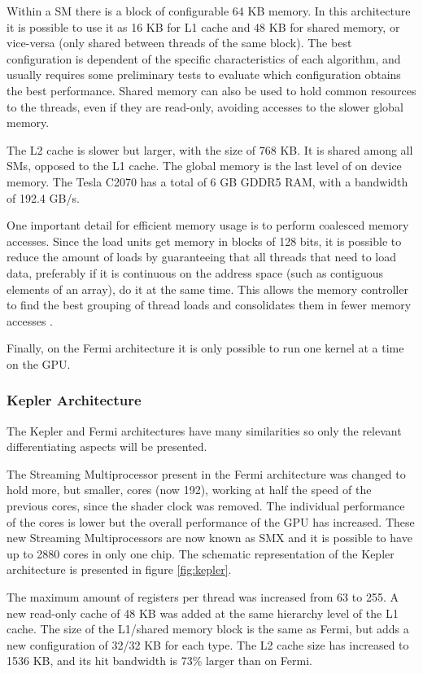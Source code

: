 Within a SM there is a block of configurable 64 KB memory. In this architecture it is possible to use it as 16 KB for L1 cache and 48 KB for shared memory, or vice-versa (only shared between threads of the same block). The best configuration is dependent of the specific characteristics of each algorithm, and usually requires some preliminary tests to evaluate which configuration obtains the best performance. Shared memory can also be used to hold common resources to the threads, even if they are read-only, avoiding accesses to the slower global memory.

The L2 cache is slower but larger, with the size of 768 KB. It is shared among all SMs, opposed to the L1 cache. The global memory is the last level of on device memory. The Tesla C2070 has a total of 6 GB GDDR5 RAM, with a bandwidth of 192.4 GB/s.

One important detail for efficient memory usage is to perform coalesced memory accesses. Since the load units get memory in blocks of 128 bits, it is possible to reduce the amount of loads by guaranteeing that all threads that need to load data, preferably if it is continuous on the address space (such as contiguous elements of an array), do it at the same time. This allows the memory controller to find the best grouping of thread loads and consolidates them in fewer memory accesses \cite{NVIDIA:Fermi}.

Finally, on the Fermi architecture it is only possible to run one kernel at a time on the GPU.

\subsubsection{\nvidia Kepler Architecture}

The Kepler and Fermi architectures have many similarities so only the relevant differentiating aspects will be presented.

The Streaming Multiprocessor present in the Fermi architecture was changed to hold more, but smaller, \cuda cores (now 192), working at half the speed of the previous \cuda cores, since the shader clock was removed. The individual performance of the \cuda cores is lower but the overall performance of the GPU has increased. These new Streaming Multiprocessors are now known as SMX and it is possible to have up to 2880 \cuda cores in only one chip. The schematic representation of the Kepler architecture is presented in figure \ref{fig:kepler}.

The maximum amount of registers per \cuda thread was increased from 63 to 255. A new read-only cache of 48 KB was added at the same hierarchy level of the L1 cache. The size of the L1/shared memory block is the same as Fermi, but adds a new configuration of 32/32 KB for each type. The L2 cache size has increased to 1536 KB, and its hit bandwidth is 73\% larger than on Fermi.

